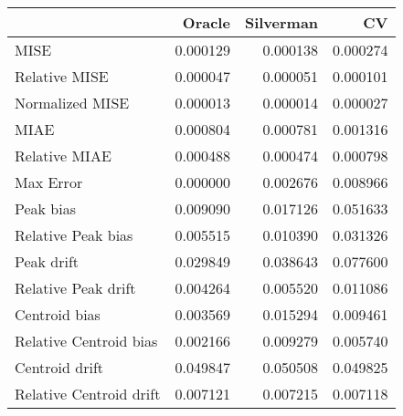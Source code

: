 \begin{tabular}{lrrr}
  \hline
 & Oracle & Silverman & CV \\ 
  \hline
MISE & 0.000129 & 0.000138 & 0.000274 \\ 
  Relative MISE & 0.000047 & 0.000051 & 0.000101 \\ 
  Normalized MISE & 0.000013 & 0.000014 & 0.000027 \\ 
  MIAE & 0.000804 & 0.000781 & 0.001316 \\ 
  Relative MIAE & 0.000488 & 0.000474 & 0.000798 \\ 
  Max Error & 0.000000 & 0.002676 & 0.008966 \\ 
  Peak bias & 0.009090 & 0.017126 & 0.051633 \\ 
  Relative Peak bias & 0.005515 & 0.010390 & 0.031326 \\ 
  Peak drift & 0.029849 & 0.038643 & 0.077600 \\ 
  Relative Peak drift & 0.004264 & 0.005520 & 0.011086 \\ 
  Centroid bias & 0.003569 & 0.015294 & 0.009461 \\ 
  Relative Centroid bias & 0.002166 & 0.009279 & 0.005740 \\ 
  Centroid drift & 0.049847 & 0.050508 & 0.049825 \\ 
  Relative Centroid drift & 0.007121 & 0.007215 & 0.007118 \\ 
   \hline
\end{tabular}
